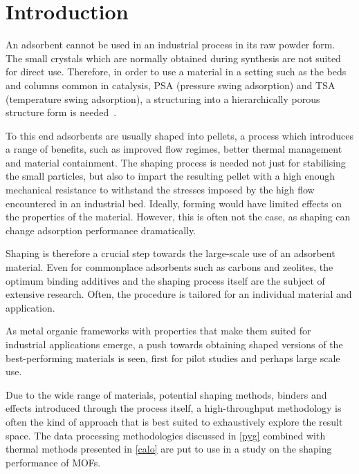 
\section{Introduction}

An adsorbent cannot be used in an industrial process in its raw powder
form. The small crystals which are normally obtained during synthesis
are not suited for direct use. Therefore, in order to use a 
material in a setting such 
as the beds and columns common in catalysis, PSA (pressure swing 
adsorption) and TSA (temperature swing adsorption), a structuring 
into a hierarchically porous structure form is 
needed~\cite{akhtarStructuringAdsorbentsCatalysts2014}.

To this end adsorbents are usually shaped into pellets, a process
which introduces a range of benefits, such as improved flow regimes,
better thermal management and material containment. The shaping process
is needed not just for stabilising the small particles, but also to
impart the resulting pellet with a high enough mechanical resistance 
to withstand the stresses imposed by the high flow encountered in 
an industrial bed. Ideally, forming would have limited effects on
the properties of the material. However, this is often not the case, 
as shaping can change adsorption performance dramatically.

Shaping is therefore a crucial step towards the large-scale
use of an adsorbent material. Even for commonplace adsorbents such as
carbons and zeolites, the optimum binding additives and the shaping
process itself are the subject of extensive research. Often, the
procedure is tailored for an individual material and application.

As metal organic frameworks with properties that make them suited 
for industrial applications emerge, a push towards obtaining shaped
versions of the best-performing materials is seen, first for 
pilot studies and perhaps large scale use.

Due to the wide range of materials, potential shaping methods, binders 
and effects introduced through the process itself, a high-throughput
methodology is often the kind of approach that is best suited to 
exhaustively explore the result space. The data processing methodologies
discussed in \autoref{pyg} combined with thermal methods
presented in \autoref{calo} are put to use in a study on the 
shaping performance of MOFs.

